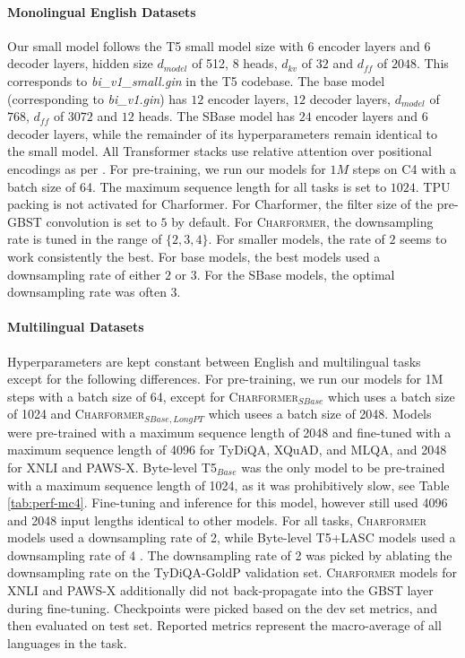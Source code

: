 \documentclass{article} \usepackage{iclr2022_conference,times}
\newcommand{\charformer}{\textsc{Charformer}\xspace}
\newcommand{\charformertall}{\textsc{Charformer}$_{SBase}$\xspace}
\newcommand{\charformertalllong}{\textsc{Charformer}$_{SBase,LongPT}$\xspace}
\newcommand{\bytebase}{Byte-level T5$_{Base}$\xspace}
\newcommand{\canine}{Byte-level T5+LASC\xspace}
\begin{document}
\paragraph{Monolingual English Datasets} Our small model follows the T5 small model size with $6$ encoder layers and $6$ decoder layers, hidden size $d_{model}$ of 512, $8$ heads, $d_{kv}$ of $32$ and $d_{ff}$ of $2048$. This corresponds to \textit{bi\_v1\_small.gin} in the T5 codebase. The base model (corresponding to \textit{bi\_v1.gin}) has $12$ encoder layers, $12$ decoder layers, $d_{model}$ of $768$, $d_{ff}$ of $3072$ and $12$ heads. The SBase model has $24$ encoder layers and $6$ decoder layers, while the remainder of its hyperparameters remain identical to the small model. All Transformer stacks use relative attention over positional encodings as per \citep{Raffel2020t5}. For pre-training, we run our models for $1M$ steps on C4 with a batch size of 64. The maximum sequence length for all tasks is set to $1024$.  TPU packing is not activated for Charformer. For Charformer, the filter size of the pre-GBST convolution is set to $5$ by default. For \charformer, the downsampling rate is tuned in the range of $\{2,3,4\}$. For smaller models, the rate of $2$ seems to work consistently the best. For base models, the best models used a downsampling rate of either $2$ or $3$. For the SBase models, the optimal downsampling rate was often $3$.

\paragraph{Multilingual Datasets} Hyperparameters are kept constant between English and multilingual tasks except for the following differences. For pre-training, we run our models for 1M steps with a batch size of 64, except for \charformertall which uses a batch size of 1024 and \charformertalllong which usees a batch size of 2048. Models were pre-trained with a maximum sequence length of 2048 and fine-tuned with a maximum sequence length of 4096 for TyDiQA, XQuAD, and MLQA, and 2048 for XNLI and PAWS-X. \bytebase was the only model to be pre-trained with a maximum sequence length of 1024, as it was prohibitively slow, see Table \ref{tab:perf-mc4}. Fine-tuning and inference for this model, however still used 4096 and 2048 input lengths identical to other models. For all tasks, \charformer models used a downsampling rate of 2, while \canine models used a downsampling rate of 4 \citep{clark2021canine}. The downsampling rate of 2 was picked by ablating the downsampling rate on the TyDiQA-GoldP validation set. \charformer models for XNLI and PAWS-X additionally did not back-propagate into the GBST layer during fine-tuning. Checkpoints were picked based on the dev set metrics, and then evaluated on test set. Reported metrics represent the macro-average of all languages in the task. 
\end{document}
